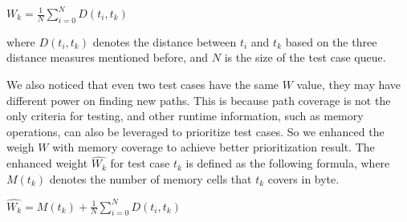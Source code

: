 \begin{center}
$W_k = \displaystyle\frac{1}{N} \sum_{i=0}^{N} D(t_i, t_k)$
\end{center}
where $D(t_i, t_k)$ denotes the distance between $t_i$ and $t_k$ based on the three distance measures mentioned before, and $N$ is the size of the test case queue. 

We also noticed that even two test cases have the same $W$ value, they may have different power on finding new paths.
 This is because path coverage is not the only criteria for testing, and other runtime information, such as memory operations, can also be leveraged to prioritize test cases. 
 So we enhanced the weigh $W$ with memory coverage to achieve better prioritization result. The enhanced weight $\hat{W_k}$ for test case $t_k$ is defined as the following formula, where $M(t_k)$ denotes the number of memory cells that $t_k$ covers in byte.
\begin{center}
$\hat{W_k} = \displaystyle M(t_k) + \frac{1}{N} \sum_{i=0}^{N} D(t_i, t_k)$
\end{center} 